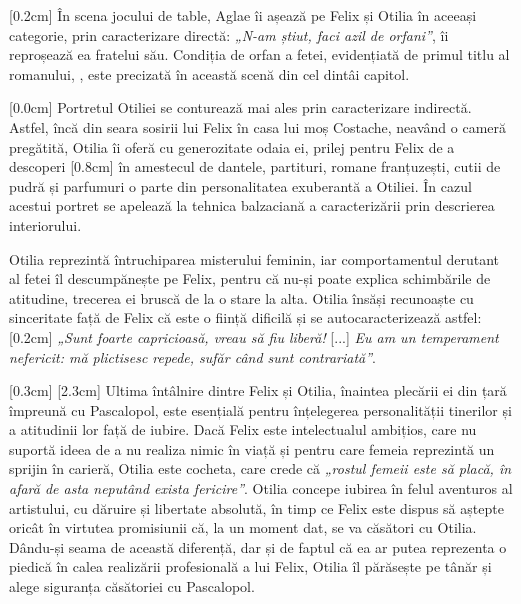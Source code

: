 [0.2cm]
În scena jocului de table, Aglae îi așează pe Felix și Otilia în aceeași categorie, prin caracterizare directă: \textit{„N-am știut, faci azil de orfani”}, îi reproșează ea fratelui său. Condiția de orfan a fetei, evidențiată de primul titlu al romanului, , este precizată în această scenă din cel dintâi capitol.

[0.0cm]
Portretul Otiliei se conturează mai ales prin caracterizare indirectă. Astfel, încă din seara sosirii lui Felix în casa lui moș Costache, neavând o cameră pregătită, Otilia îi oferă cu generozitate odaia ei, prilej pentru Felix de a descoperi
[0.8cm]
în amestecul de dantele, partituri, romane franțuzești, cutii de pudră și parfumuri o parte din personalitatea exuberantă a Otiliei. În cazul acestui portret se apelează la tehnica balzaciană a caracterizării prin descrierea interiorului.

Otilia reprezintă întruchiparea misterului feminin, iar comportamentul   derutant al fetei îl descumpănește pe Felix, pentru că nu-și poate explica schimbările de atitudine, trecerea ei bruscă de la o stare la alta. Otilia însăși recunoaște cu sinceritate față de Felix că este o ființă dificilă și se autocaracterizează astfel:
[0.2cm]
\textit{„Sunt foarte capricioasă, vreau să fiu liberă!} [...] \textit{Eu am un temperament nefericit: mă plictisesc repede, sufăr când sunt contrariată”}.

[0.3cm]
[2.3cm]
Ultima întâlnire dintre Felix și Otilia, înaintea plecării ei din țară împreună cu Pascalopol, este esențială pentru înțelegerea personalității tinerilor și a atitudinii lor față de iubire. Dacă Felix este intelectualul ambițios, care nu suportă ideea de a nu realiza nimic în viață și pentru care femeia reprezintă un sprijin în carieră, Otilia este cocheta, care crede că \textit{„rostul femeii este să placă, în afară de asta neputând exista fericire”}. Otilia concepe iubirea în felul aventuros al artistului, cu dăruire și libertate absolută, în timp ce Felix este dispus să aștepte oricât în virtutea promisiunii că, la un moment dat, se va căsători cu Otilia. Dându-și seama de această diferență, dar și de faptul că ea ar putea reprezenta o piedică în calea realizării profesională a lui Felix, Otilia îl părăsește pe tânăr și alege siguranța căsătoriei cu Pascalopol.


